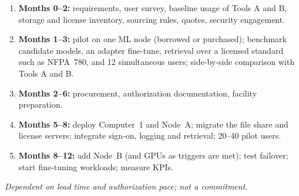 
\begin{enumerate}
  \item \textbf{Months 0--2:} requirements, user survey, baseline usage of Tools A and B,
    storage and license inventory, sourcing rules, quotes, security engagement.
  \item \textbf{Months 1--3:} pilot on one ML node (borrowed or purchased); benchmark
    candidate models, an adapter fine-tune, retrieval over a licensed standard such as
    NFPA~780, and 12 simultaneous users; side-by-side comparison with Tools A and B.
  \item \textbf{Months 2--6:} procurement, authorization documentation, facility
    preparation.
  \item \textbf{Months 5--8:} deploy Computer~1 and Node~A; migrate the file share and
    license servers; integrate sign-on, logging and retrieval; 20--40 pilot users.
  \item \textbf{Months 8--12:} add Node~B (and GPUs as triggers are met); test failover;
    start fine-tuning workloads; measure KPIs.
\end{enumerate}
\emph{Dependent on lead time and authorization pace; not a commitment.}
